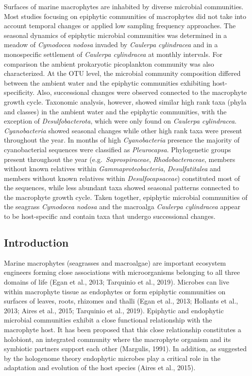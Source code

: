 \documentclass[
  12pt,
]{article}
\begin{document}
Surfaces of marine macrophytes are inhabited by diverse microbial
communities. Most studies focusing on epiphytic communities of
macrophytes did not take into account temporal changes or applied low
sampling frequency approaches. The seasonal dynamics of epiphytic
microbial communities was determined in a meadow of \emph{Cymodocea
nodosa} invaded by \emph{Caulerpa cylindracea} and in a monospecific
settlement of \emph{Caulerpa cylindracea} at monthly intervals. For
comparison the ambient prokaryotic picoplankton community was also
characterized. At the OTU level, the microbial community composition
differed between the ambient water and the epiphytic communities
exhibiting host-specificity. Also, successional changes were observed
connected to the macrophyte growth cycle. Taxonomic analysis, however,
showed similar high rank taxa (phyla and classes) in the ambient water
and the epiphytic communities, with the exception of
\emph{Desulfobacterota}, which were only found on \emph{Caulerpa
cylindracea}. \emph{Cyanobacteria} showed seasonal changes while other
high rank taxa were present throughout the year. In months of high
\emph{Cyanobacteria} presence the majority of cyanobacterial sequences
were classified as \emph{Pleurocapsa}. Phylogenetic groups present
throughout the year (e.g.~\emph{Saprospiraceae},
\emph{Rhodobacteraceae}, members without known relatives within
\emph{Gammaproteobacteria}, \emph{Desulfatitalea} and members without
known relatives within \emph{Desulfocapsaceae}) constituted most of the
sequences, while less abundant taxa showed seasonal patterns connected
to the macrophyte growth cycle. Taken together, epiphytic microbial
communities of the seagrass \emph{Cymodocea nodosa} and the macroalga
\emph{Caulerpa cylindracea} appear to be host-specific and contain taxa
that undergo successional changes.

\newpage

\hypertarget{introduction}{%
\subsection{Introduction}\label{introduction}}

Marine macrophytes (seagrasses and macroalgae) are important ecosystem
engineers forming close associations with microorganisms belonging to
all three domains of life (Egan et al., 2013; Tarquinio et al., 2019).
Microbes can live within macrophyte tissue as endophytes or form
epiphytic communities on surfaces of leaves, roots, rhizomes and thalli
(Egan et al., 2013; Hollants et al., 2013; Aires et al., 2015; Tarquinio
et al., 2019). Epiphytic and endophytic microbial communities exhibit a
close functional relationship with the macrophyte host. It has been
proposed that this close relationship constitutes a holobiont, an
integrated community where the macrophyte organism and its symbiotic
partners support each other (Margulis, 1991). In addition, as suggested
by the hologenome theory endophytic microbes play a critical role in the
adaptation and evolution of the host species (Aires et al., 2015).
\end{document}
